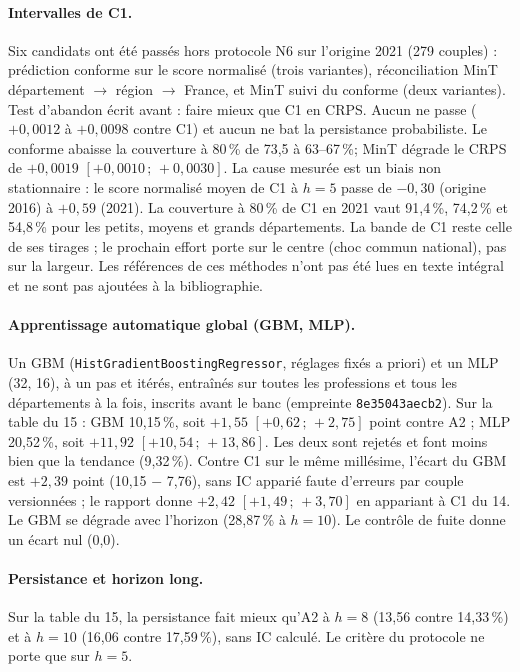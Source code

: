 \documentclass[11pt]{article}
\begin{document}
\paragraph{Intervalles de C1.} Six candidats ont été passés hors protocole N6 sur l'origine 2021 (279
couples) : prédiction conforme sur le score normalisé (trois variantes), réconciliation MinT
département $\to$ région $\to$ France, et MinT suivi du conforme (deux variantes). Test d'abandon écrit
avant : faire mieux que C1 en CRPS. Aucun ne passe ($+0{,}0012$ à $+0{,}0098$\mesure{} contre C1) et aucun ne
bat la persistance probabiliste. Le conforme abaisse la couverture à 80\,\% de 73,5 à 63--67\,\%\mesure ;
MinT dégrade le CRPS de $+0{,}0019$ $[+0{,}0010\,;\,+0{,}0030]$\mesure. La cause mesurée est un biais non
stationnaire : le score normalisé moyen de C1 à $h = 5$ passe de $-0{,}30$ (origine 2016) à $+0{,}59$
(2021)\mesure. La couverture à 80\,\% de C1 en 2021 vaut 91,4\,\%, 74,2\,\% et 54,8\,\%\mesure{} pour les
petits, moyens et grands départements. La bande de C1 reste celle de ses tirages ; le prochain effort
porte sur le centre (choc commun national), pas sur la largeur. Les références de ces méthodes n'ont pas
été lues en texte intégral et ne sont pas ajoutées à la bibliographie.

\paragraph{Apprentissage automatique global (GBM, MLP).} Un GBM (\texttt{HistGradientBoostingRegressor},
réglages fixés a priori) et un MLP (32, 16), à un pas et itérés, entraînés sur toutes les professions et
tous les départements à la fois, inscrits avant le banc (empreinte \texttt{8e35043aecb2}). Sur la table du
15 : GBM 10,15\,\%\mesure, soit $+1{,}55$ $[+0{,}62\,;\,+2{,}75]$\mesure{} point contre A2 ; MLP
20,52\,\%\mesure, soit $+11{,}92$ $[+10{,}54\,;\,+13{,}86]$\mesure. Les deux sont rejetés et font moins bien
que la tendance (9,32\,\%\mesure). Contre C1 sur le même millésime, l'écart du GBM est $+2{,}39$\derive{}
point (10,15 $-$ 7,76), sans IC apparié faute d'erreurs par couple versionnées ; le rapport donne
$+2{,}42$ $[+1{,}49\,;\,+3{,}70]$\mesure{} en appariant à C1 du 14. Le GBM se dégrade avec l'horizon
(28,87\,\%\mesure{} à $h = 10$). Le contrôle de fuite donne un écart nul (0,0\mesure).

\paragraph{Persistance et horizon long.} Sur la table du 15, la persistance fait mieux qu'A2 à $h = 8$
(13,56 contre 14,33\,\%\mesure) et à $h = 10$ (16,06 contre 17,59\,\%\mesure), sans IC calculé. Le critère du
protocole ne porte que sur $h = 5$.
\end{document}

